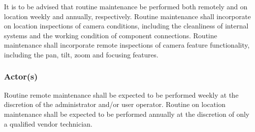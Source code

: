 It is to be advised that routine maintenance be performed both remotely and on location weekly and annually, respectively.
Routine maintenance shall incorporate on location inspections of camera conditions, including the cleanliness of internal systems and the working condition of component connections.
Routine maintenance shall incorporate remote inspections of camera feature functionality, including the pan, tilt, zoom and focusing features.

\subsubsection{Actor(s)}
Routine remote maintenance shall be expected to be performed weekly at the discretion of the administrator and/or user operator.
Routine on location maintenance shall be expected to be performed annually at the discretion of only a qualified vendor technician.
